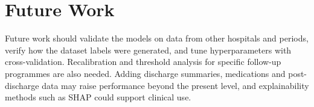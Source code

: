 \documentclass[conference,a4paper]{IEEEtran}
\begin{document}
\section{Future Work}
Future work should validate the models on data from other hospitals and periods, verify how the dataset labels were generated, and tune hyperparameters with cross-validation. Recalibration and threshold analysis for specific follow-up programmes are also needed. Adding discharge summaries, medications and post-discharge data may raise performance beyond the present level, and explainability methods such as SHAP could support clinical use.



\end{document}
